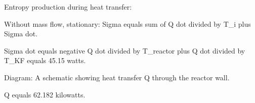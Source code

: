 Entropy production during heat transfer:  

Without mass flow, stationary:  
Sigma equals sum of Q dot divided by T_i plus Sigma dot.  

Sigma dot equals negative Q dot divided by T_reactor plus Q dot divided by T_KF equals 45.15 watts.  

Diagram: A schematic showing heat transfer Q through the reactor wall.  

Q equals 62.182 kilowatts.